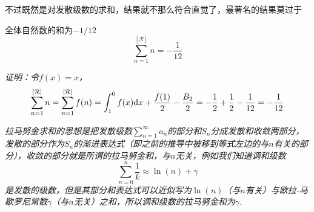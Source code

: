 \documentclass[main.tex]{subfiles}
\begin{document}
不过既然是对发散级数的求和，结果就不那么符合直觉了，最著名的结果莫过于
\begin{proposition}{全体自然数的和为\(-1/12\)}
    \[\sum_{n=1}^{[\mathcal{R}]}n=-\frac{1}{12}\]
\end{proposition}
\textit{证明：令\(f(x)=x\)，}
\[\sum_{n=1}^{[\mathcal{R}]}n = \sum_{n=1}^{[\mathcal{R}]}f(n) = \int_{1}^{0}f(x){\rm d}x+\frac{f(1)}{2}-\frac{B_2}{2} = -\frac{1}{2}+\frac{1}{2}-\frac{1}{12} = -\frac{1}{12}\]

\textit{
    拉马努金求和的思想是把发散级数\(\displaystyle{\sum_{n=1}^{\infty}a_n}\)的部分和\(S_n\)分成发散和收敛两部分，发散的部分作为\(S_n\)的渐进表达式（即之前的推导中被移到等式左边的与\(n\)有关的部分），收敛的部分就是所谓的拉马努金和，与\(n\)无关，例如我们知道调和级数
    \[\sum_{n=0}^{n}\frac{1}{k} \approx \ln(n)+\gamma\]
    是发散的级数，但是其部分和表达式可以近似写为\(\ln(n)\)（与\(n\)有关）与欧拉-马歇罗尼常数\(\gamma\)（与\(n\)无关）之和，所以调和级数的拉马努金和为\(\gamma\).
}
\end{document}
